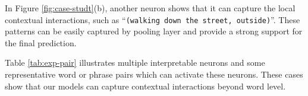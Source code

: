 \documentclass{article}
\begin{document}
In Figure \ref{fig:case-studt}(b), another neuron shows that it can capture the local contextual interactions, such as ``\texttt{(walking down the street, outside)}''. These patterns can be easily captured by pooling layer and provide a strong support for the final prediction.

Table \ref{tab:exp-pair} illustrates multiple interpretable neurons and some representative word or phrase pairs which can activate these neurons. %
These cases show that our models can capture contextual interactions beyond word level.














\end{document}

